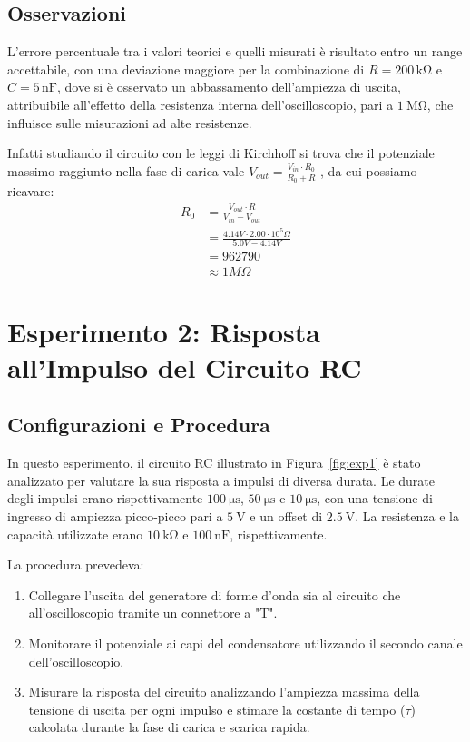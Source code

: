 \documentclass[a4paper,12pt]{article}
\begin{document}
\subsection{Osservazioni}
L'errore percentuale tra i valori teorici e quelli misurati è risultato entro un range accettabile, con una deviazione maggiore per la combinazione di \( R = 200 \, \mathrm{k\Omega} \) e \( C = 5 \, \mathrm{nF} \), dove si è osservato un abbassamento dell'ampiezza di uscita, attribuibile all'effetto della resistenza interna dell'oscilloscopio, pari a \(\SI{1}{\mega\ohm}\), che influisce sulle misurazioni ad alte resistenze.

Infatti studiando il circuito con le leggi di Kirchhoff si trova che il potenziale massimo raggiunto nella fase di carica vale \(V_{out} = \frac{V_{in} \cdot R_0}{R_0 + R}\) , da cui possiamo ricavare:
\[
    \begin{aligned}
        R_0 
        &= \frac{V_{out} \cdot R}{V_{in} - V_{out}} \\
        &= \frac{4.14 V \cdot 2.00 \cdot 10^5 \Omega}{5.0 V - 4.14 V}    \\
        &= 962790 \\
        & \approx 1 M \Omega
    \end{aligned}
\]




\section{Esperimento 2: Risposta all'Impulso del Circuito RC}

\subsection{Configurazioni e Procedura}

\begin{multicols}{2}
In questo esperimento, il circuito RC illustrato in Figura~\ref{fig:exp1} è stato analizzato per valutare la sua risposta a impulsi di diversa durata. Le durate degli impulsi erano rispettivamente \(\SI{100}{\micro\second}\), \(\SI{50}{\micro\second}\) e \(\SI{10}{\micro\second}\), con una tensione di ingresso di ampiezza picco-picco pari a \(\SI{5}{\volt}\) e un offset di \(\SI{2.5}{\volt}\). La resistenza e la capacità utilizzate erano \(\SI{10}{\kilo\ohm}\) e \(\SI{100}{\nano\farad}\), rispettivamente.

La procedura prevedeva:
\begin{enumerate}
    \item Collegare l'uscita del generatore di forme d’onda sia al circuito che all'oscilloscopio tramite un connettore a "T".
    \item Monitorare il potenziale ai capi del condensatore utilizzando il secondo canale dell'oscilloscopio.
    \item Misurare la risposta del circuito analizzando l’ampiezza massima della tensione di uscita per ogni impulso e stimare la costante di tempo (\(\tau\)) calcolata durante la fase di carica e scarica rapida.
\end{enumerate}

\end{multicols}
\end{document}
